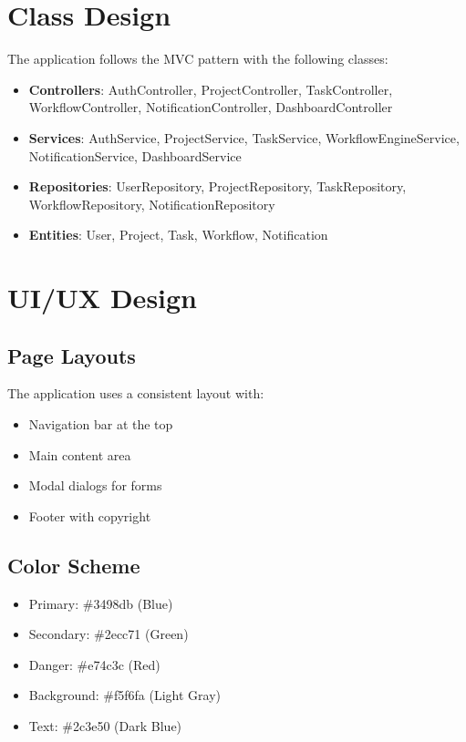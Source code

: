 \documentclass[12pt,a4paper,twoside]{book}
\begin{document}
\section{Class Design}

The application follows the MVC pattern with the following classes:

\begin{itemize}
    \item \textbf{Controllers}: AuthController, ProjectController, TaskController, WorkflowController, NotificationController, DashboardController
    \item \textbf{Services}: AuthService, ProjectService, TaskService, WorkflowEngineService, NotificationService, DashboardService
    \item \textbf{Repositories}: UserRepository, ProjectRepository, TaskRepository, WorkflowRepository, NotificationRepository
    \item \textbf{Entities}: User, Project, Task, Workflow, Notification
\end{itemize}

\section{UI/UX Design}

\subsection{Page Layouts}

The application uses a consistent layout with:
\begin{itemize}
    \item Navigation bar at the top
    \item Main content area
    \item Modal dialogs for forms
    \item Footer with copyright
\end{itemize}

\subsection{Color Scheme}
\begin{itemize}
    \item Primary: \#3498db (Blue)
    \item Secondary: \#2ecc71 (Green)
    \item Danger: \#e74c3c (Red)
    \item Background: \#f5f6fa (Light Gray)
    \item Text: \#2c3e50 (Dark Blue)
\end{itemize}
\end{document}
